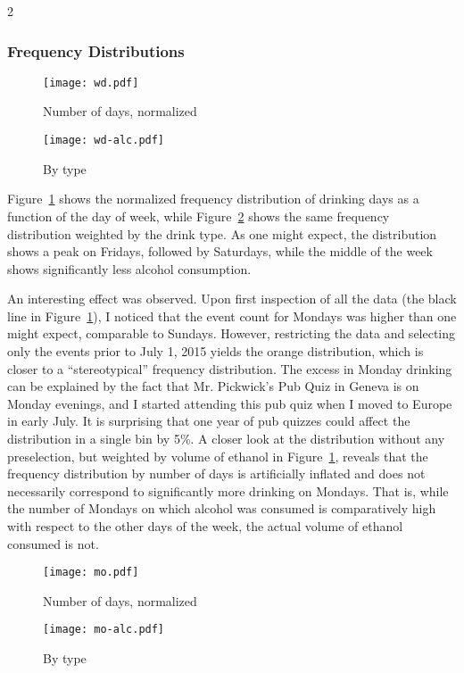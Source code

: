 \documentclass{article}
\newlength{\figwig}
\begin{document}
\begin{multicols}{2}
	\subsubsection*{Frequency Distributions}
	\begin{figure*}[!p]
		\centering
		\begin{subfigure}[b]{\figwig}
			\texttt{[image: wd.pdf]}
			\caption{Number of days, normalized}
			\label{wd}
		\end{subfigure}
		\begin{subfigure}[b]{\figwig}
			\texttt{[image: wd-alc.pdf]}
			\caption{By type}
			\label{wd-alc}
		\end{subfigure}
		\caption{Frequency distributions parameterized by weekday.}
	\end{figure*}
	Figure~\ref{wd} shows the normalized frequency distribution of drinking days as a function of the day of week, while Figure~\ref{wd-alc} shows the same frequency distribution weighted by the drink type. As one might expect, the distribution shows a peak on Fridays, followed by Saturdays, while the middle of the week shows significantly less alcohol consumption.
	
	An interesting effect was observed. Upon first inspection of all the data (the black line in Figure~\ref{wd}), I noticed that the event count for Mondays was higher than one might expect, comparable to Sundays. However, restricting the data and selecting only the events prior to July 1, 2015 yields the orange distribution, which is closer to a ``stereotypical'' frequency distribution. The excess in Monday drinking can be explained by the fact that Mr. Pickwick's Pub Quiz in Geneva is on Monday evenings, and I started attending this pub quiz when I moved to Europe in early July. It is surprising that one year of pub quizzes could affect the distribution in a single bin by 5\%. A closer look at the distribution without any preselection, but weighted by volume of ethanol in Figure~\ref{wd}, reveals that the frequency distribution by number of days is artificially inflated and does not necessarily correspond to significantly more drinking on Mondays. That is, while the number of Mondays on which alcohol was consumed is comparatively high with respect to the other days of the week, the actual volume of ethanol consumed is not.

	\begin{figure*}[!p]
		\centering
		\begin{subfigure}[b]{\figwig}
			\texttt{[image: mo.pdf]}
			\caption{Number of days, normalized}
			\label{mo}
		\end{subfigure}
		\begin{subfigure}[b]{\figwig}
			\texttt{[image: mo-alc.pdf]}
			\caption{By type}
			\label{mo-alc}
		\end{subfigure}
		\caption{Frequency distributions parameterized by month, through December 2015.}
	\end{figure*}


\end{multicols}
\end{document}
